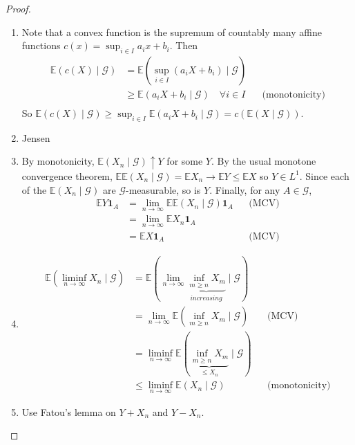 \documentclass[parskip=full]{article}
\theoremstyle{definition}
\newcommand{\1}{\mathbbm{1}}
\newcommand{\E}{\mathbb{E}}
\begin{document}
  \begin{proof}
    \begin{enumerate}
        \item Note that a convex function is the supremum of countably many affine functions $c(x) = \sup_{i \in I} a_i x + b_i$. Then
        \begin{align*}
            \E(c(X) \mid \mathcal{G}) &= \E \left(\sup_{i \in I}\left( a_i X + b_i \right)\mid \mathcal{G} \right)\\
            &\geq \E(a_i X + b_i \mid \mathcal{G}) \quad \forall i \in I &&\text{(monotonicity)}\\
        \end{align*} 
        So $\E(c(X) \mid \mathcal{G}) \geq \sup_{i \in I} \E(a_i X + b_i \mid \mathcal{G}) = c(\E(X \mid \mathcal{G}))$.
        \item Jensen
        \item By monotonicity, $\E(X_n \mid \mathcal{G}) \uparrow Y$ for some $Y$. By the usual monotone convergence theorem, $\E \E (X_n \mid \mathcal{G}) = \E X_n \to \E Y \leq \E X$ so $Y \in L^1$. Since each of the $\E (X_n \mid \mathcal{G})$ are $\mathcal{G}$-measurable, so is $Y$. Finally, for any $A \in \mathcal{G}$, 
        \begin{align*}
            \E Y \mathbf{1}_A &= \lim_{n \to \infty} \E \E(X_n \mid \mathcal{G}) \mathbf{1}_A &&\text{(MCV)}\\
            &= \lim_{n \to \infty} \E X_n \mathbf{1}_A\\
            &= \E X \mathbf{1}_A &&\text{(MCV)}
        \end{align*}
        \item \begin{align*}
            \E \left (\liminf_{n \to \infty} X_n \mid \mathcal{G} \right) &= \E \left (\lim_{n \to \infty} \underbrace{\inf_{m \geq n} X_m}_{increasing} \mid \mathcal{G} \right)\\
            &= \lim_{n \to \infty} \E \left (\inf_{m \geq n} X_m \mid \mathcal{G} \right) &&\text{(MCV)}\\
            &= \liminf_{n \to \infty} \E \left (\underbrace{\inf_{m \geq n} X_m}_{\leq X_n} \mid \mathcal{G}\right)\\
            &\leq \liminf_{n \to \infty}\E(X_n \mid \mathcal{G}) &&\text{(monotonicity)}
        \end{align*}
        \item Use Fatou's lemma on $Y + X_n$ and $Y - X_n$.
    \end{enumerate}
  \end{proof}
\end{document}
